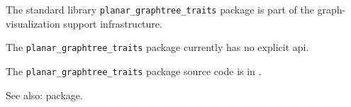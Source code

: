 
The standard library {\tt planar\_graphtree\_traits} package is part of the graph-visualization support infrastructure.

The {\tt planar\_graphtree\_traits} package currently has no explicit api.

The {\tt planar\_graphtree\_traits} package source code is in .

See also:  package.



